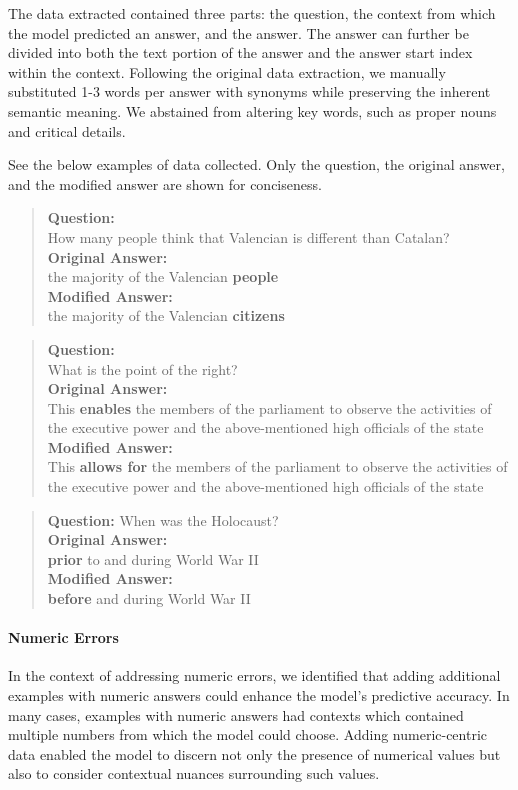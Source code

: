 \documentclass{article}
\begin{document}
The data extracted contained three parts: the question, the
context from which the model predicted an answer, and the
answer. The answer can further be divided into both the text
portion of the answer and the answer start index within the
context. Following the original data extraction, we manually
substituted 1-3 words per answer with synonyms while preserving
the inherent semantic meaning. We abstained from altering key
words, such as proper nouns and critical details.

See the below examples of data collected. Only the question,
the original answer, and the modified answer are shown for
conciseness.

\begin{quote}
  \textbf{Question:}\\ How many people think that Valencian is
  different than Catalan?\\
  \textbf{Original Answer:}\\ the majority of the Valencian \textbf{people}\\
  \textbf{Modified Answer:}\\ the majority of the Valencian \textbf{citizens}
  \end{quote}

  \begin{quote}
  \textbf{Question:}\\ What is the point of the right?\\
  \textbf{Original Answer:}\\ This \textbf{enables} the members of the
  parliament to observe the activities of the executive power
  and the above-mentioned high officials of the state\\
  \textbf{Modified Answer:}\\ This \textbf{allows for} the members of the
  parliament to observe the activities of the executive power
  and the above-mentioned high officials of the state
  \end{quote}

  \begin{quote}
  \textbf{Question:} When was the Holocaust?\\
  \textbf{Original Answer:}\\ \textbf{prior} to and during World War II\\
  \textbf{Modified Answer:}\\ \textbf{before} and during World War II
\end{quote}

\paragraph{Numeric Errors}
In the context of addressing numeric errors,
we identified that adding additional examples with numeric answers
could enhance the model's predictive accuracy.
In many cases, examples with numeric answers had contexts
which contained multiple numbers from which the model could choose.
Adding numeric-centric data enabled the model to discern not only
the presence of numerical values but also to consider
contextual nuances surrounding such values.
\end{document}
